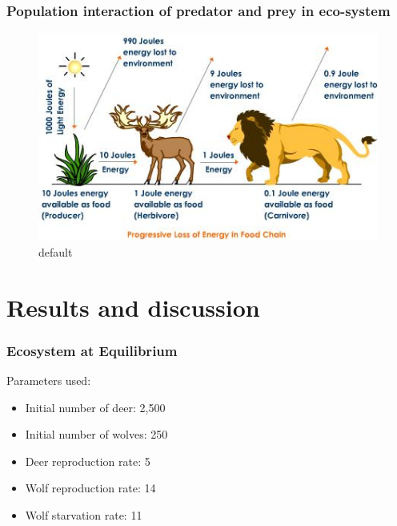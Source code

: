 \documentclass{beamer}
\begin{document}
\frame
{
	\frametitle{Population interaction of predator and prey in eco-system}

	\begin{figure}[htbp]
	\begin{center}
	\includegraphics[width=1\textwidth]{./pics/progressive-energy-loss.jpeg}
	\caption{default}
	\label{default}
	\end{center}
	\end{figure}
}


\section{Results and discussion}
\frame
{
  \frametitle{Ecosystem at Equilibrium}
  Parameters used: 
  \begin{itemize}
  \item{Initial number of deer: 2,500}
  \item{Initial number of wolves: 250}
  \item{Deer reproduction rate: 5}
  \item{Wolf reproduction rate: 14}
  \item{Wolf starvation rate: 11}
  \end{itemize}

  
}
\end{document}

